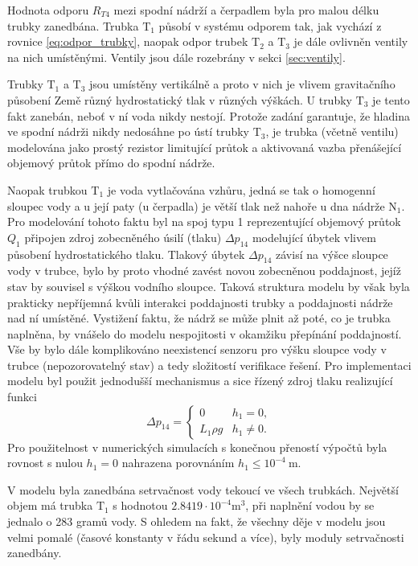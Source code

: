 \documentclass[twoside]{article}
\begin{document}
Hodnota odporu $R_{T4}$ mezi spodní nádrží a čerpadlem byla pro malou délku trubky zanedbána.
Trubka $\text{T}_1$ působí v systému odporem tak, jak vychází z rovnice \eqref{eq:odpor_trubky},
naopak odpor trubek $\text{T}_2$ a $\text{T}_3$ je dále ovlivněn ventily na nich umístěnými.
Ventily jsou dále rozebrány v sekci \ref{sec:ventily}.

Trubky $\text{T}_1$ a $\text{T}_3$ jsou umístěny vertikálně a proto v nich je vlivem gravitačního působení Země různý hydrostatický
tlak v různých výškách.
U trubky $\text{T}_3$ je tento fakt zanebán, neboť v ní voda nikdy nestojí. Protože zadání garantuje, že hladina ve spodní nádrži
nikdy nedosáhne po ústí trubky $\text{T}_3$, je trubka (včetně ventilu) modelována jako prostý rezistor limitující průtok a aktivovaná vazba
přenášející objemový průtok přímo do spodní nádrže.

Naopak trubkou $\text{T}_1$ je voda vytlačována vzhůru, jedná se tak o homogenní sloupec vody a u její paty (u čerpadla)
je větší tlak než nahoře u dna nádrže $\text{N}_1$.
Pro modelování tohoto faktu byl na spoj typu 1 reprezentující objemový průtok $Q_1$ připojen zdroj zobecněného úsilí (tlaku)
$\Delta p_{14}$ modelující úbytek vlivem působení hydrostatického tlaku. Tlakový úbytek $\Delta p_{14}$ závisí na výšce sloupce vody
v trubce, bylo by proto vhodné zavést novou zobecněnou poddajnost, jejíž stav by souvisel s výškou vodního sloupce.
Taková struktura modelu by však byla prakticky nepříjemná kvůli interakci poddajnosti trubky a poddajnosti nádrže nad ní umístěné.
Vystižení faktu, že nádrž se může plnit až poté, co je trubka naplněna, by vnášelo do modelu nespojitosti v okamžiku přepínání poddajností.
Vše by bylo dále komplikováno neexistencí senzoru pro výšku sloupce vody v trubce (nepozorovatelný stav) a tedy složitostí verifikace řešení.
Pro implementaci modelu byl použit jednodušší mechanismus a sice řízený zdroj tlaku realizující funkci
\begin{equation}
    \Delta p_{14} = \begin{cases}
        0 & h_1 = 0, \\
        L_1 \rho g & h_1 \neq 0.
    \end{cases}
\end{equation}
Pro použitelnost v numerických simulacích s konečnou přeností výpočtů byla
rovnost s nulou $h_1 = 0$ nahrazena porovnáním $h_1 \le 10^{-4}~\si{\metre}$.

V modelu byla zanedbána setrvačnost vody tekoucí ve všech trubkách. Největší objem má trubka $\text{T}_1$ s hodnotou $2.8419 \cdot 10^{-4} \si{\metre\cubed}$,
při naplnění vodou by se jednalo o 283 gramů vody. S ohledem na fakt, že všechny děje v modelu jsou velmi pomalé (časové konstanty v řádu sekund a více),
byly moduly setrvačnosti zanedbány.
\end{document}
